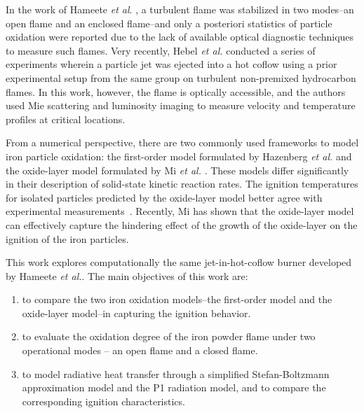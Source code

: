 \documentclass[twocolumn,9pt]{article} %
\begin{document}
In the work of Hameete \textit{et al}. \cite{hameete2024aerosol,hameetethesis}, a turbulent flame was stabilized in two modes--an open flame and an enclosed flame--and only a posteriori statistics of particle oxidation were reported due to the lack of available optical diagnostic techniques to measure such flames. Very recently, Hebel \emph{et al.} conducted a series of experiments wherein a particle jet was ejected into a hot coflow using a prior experimental setup from the same group \cite{eitel2015novel} on turbulent non-premixed hydrocarbon flames. In this work, however, the flame is optically accessible, and the authors used Mie scattering and luminosity imaging to measure velocity and temperature profiles at critical locations.

From a numerical perspective, there are two commonly used frameworks to model iron particle oxidation: the first-order model formulated by Hazenberg \emph{et al.} \cite{Hazenberg} and the oxide-layer model formulated by Mi \emph{et al.} \cite{Mi2022}. These models differ significantly in their description of solid-state kinetic reaction rates. The ignition temperatures for isolated particles predicted by the oxide-layer model better agree with experimental measurements~\cite{chang2026experimental,cen2025detailed, Ning2024,Abdallah_2024}. Recently, Mi \cite{mi2025theoretical} has shown that the oxide-layer model can effectively capture the hindering effect of the growth of the oxide-layer on the ignition of the iron particles. 

This work explores computationally the same jet-in-hot-coflow burner developed by Hameete \emph{et al.}\cite{hameete2024aerosol}. The main objectives of this work are:
\begin{enumerate}[wide, labelindent=0pt,itemsep=0pt]
    \item to compare the two iron oxidation models--the first-order model and the oxide-layer model--in capturing the ignition behavior.
    \item to evaluate the oxidation degree of the iron powder flame under two operational modes -- an open flame and a closed flame.
    \item to model radiative heat transfer through a simplified Stefan-Boltzmann approximation model and the P1 radiation model, and to compare the corresponding ignition characteristics.
\end{enumerate}
\end{document}
